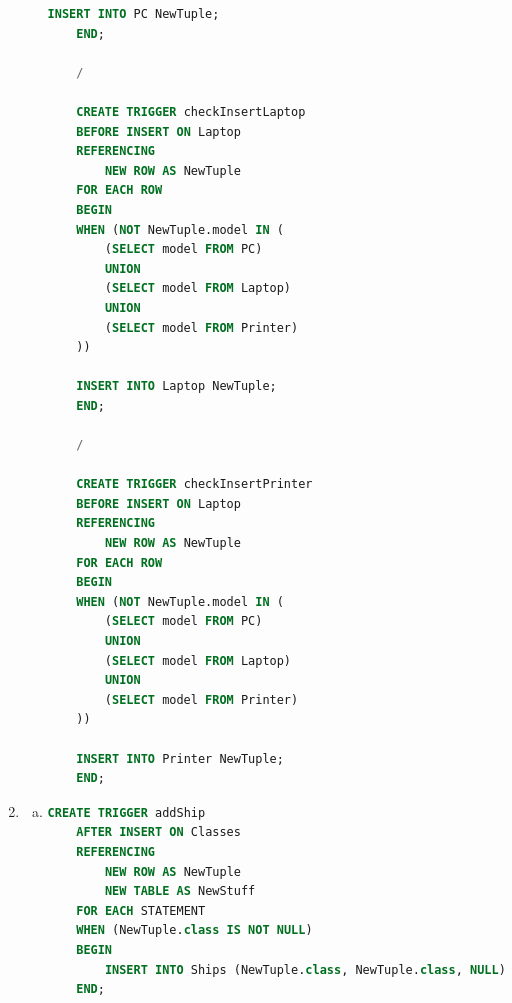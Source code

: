 \documentclass[12pt]{article}
\begin{document}
\begin{enumerate}[1.]
\begin{enumerate}[a)]
\begin{lstlisting}[language=SQL]
    INSERT INTO PC NewTuple;
    END;

    /

    CREATE TRIGGER checkInsertLaptop
    BEFORE INSERT ON Laptop
    REFERENCING
        NEW ROW AS NewTuple
    FOR EACH ROW
    BEGIN
    WHEN (NOT NewTuple.model IN (
        (SELECT model FROM PC)
        UNION
        (SELECT model FROM Laptop)
        UNION
        (SELECT model FROM Printer)
    ))

    INSERT INTO Laptop NewTuple;
    END;

    /

    CREATE TRIGGER checkInsertPrinter
    BEFORE INSERT ON Laptop
    REFERENCING
        NEW ROW AS NewTuple
    FOR EACH ROW
    BEGIN
    WHEN (NOT NewTuple.model IN (
        (SELECT model FROM PC)
        UNION
        (SELECT model FROM Laptop)
        UNION
        (SELECT model FROM Printer)
    ))

    INSERT INTO Printer NewTuple;
    END;
    \end{lstlisting}

    \end{enumerate}

    \item

    \begin{enumerate}[a)]
        \item

    \begin{lstlisting}[language=SQL]
    CREATE TRIGGER addShip
    AFTER INSERT ON Classes
    REFERENCING
        NEW ROW AS NewTuple
        NEW TABLE AS NewStuff
    FOR EACH STATEMENT
    WHEN (NewTuple.class IS NOT NULL)
    BEGIN
        INSERT INTO Ships (NewTuple.class, NewTuple.class, NULL)
    END;
    \end{lstlisting}
    \end{enumerate}

\end{enumerate}
\end{document}

